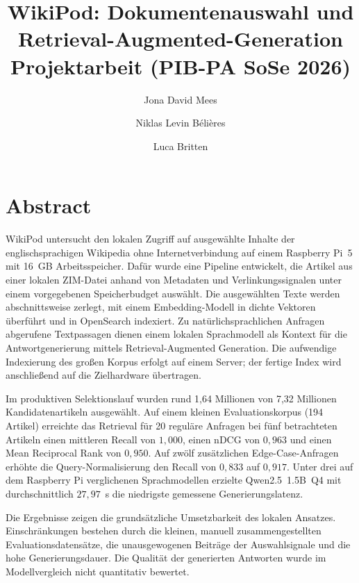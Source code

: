 \documentclass[a4paper,11pt,oneside,openany]{scrreprt}
\title{
    WikiPod: Dokumentenauswahl und Retrieval-Augmented-Generation\\
    \large Projektarbeit (PIB-PA SoSe 2026)
}
\author{
    Jona David Mees \and
    Niklas Levin Bélières \and
    Luca Britten
}
\date{}
\begin{document}
\maketitle

\chapter*{Abstract}
WikiPod untersucht den lokalen Zugriff auf ausgewählte Inhalte der
englischsprachigen Wikipedia ohne Internetverbindung auf einem Raspberry Pi~5
mit 16~GB Arbeitsspeicher. Dafür wurde eine Pipeline entwickelt, die Artikel
aus einer lokalen ZIM-Datei anhand von Metadaten und Verlinkungssignalen unter
einem vorgegebenen Speicherbudget auswählt. Die ausgewählten Texte werden
abschnittsweise zerlegt, mit einem Embedding-Modell in dichte Vektoren
überführt und in OpenSearch indexiert. Zu natürlichsprachlichen Anfragen
abgerufene Textpassagen dienen einem lokalen Sprachmodell als Kontext für
die Antwortgenerierung mittels Retrieval-Augmented Generation. Die aufwendige
Indexierung des großen Korpus erfolgt auf einem Server; der fertige Index
wird anschließend auf die Zielhardware übertragen.

Im produktiven Selektionslauf wurden rund 1,64 Millionen von 7,32 Millionen
Kandidatenartikeln ausgewählt. Auf einem kleinen Evaluationskorpus
(194 Artikel) erreichte das Retrieval für 20 reguläre Anfragen bei fünf
betrachteten Artikeln einen mittleren Recall von $1{,}000$, einen nDCG von $0{,}963$ und
einen Mean Reciprocal Rank von $0{,}950$. Auf zwölf zusätzlichen
Edge-Case-Anfragen erhöhte die Query-Normalisierung den Recall von
$0{,}833$ auf $0{,}917$. Unter drei auf dem Raspberry Pi verglichenen
Sprachmodellen erzielte Qwen2.5~1.5B~Q4 mit durchschnittlich $27{,}97$~s
die niedrigste gemessene Generierungslatenz.

Die Ergebnisse zeigen die grundsätzliche Umsetzbarkeit des lokalen Ansatzes.
Einschränkungen bestehen durch die kleinen, manuell zusammengestellten
Evaluationsdatensätze, die unausgewogenen Beiträge der Auswahlsignale und
die hohe Generierungsdauer. Die Qualität der generierten Antworten wurde
im Modellvergleich nicht quantitativ bewertet.


\tableofcontents
\clearpage
\begingroup
\let\clearpage\relax
\listoffigures
\listoftables
\endgroup

\clearpage
{}









\begingroup
{}

\par
\endgroup

\clearpage
\begingroup
\small
\singlespacing
\raggedright
\printbibliography
\endgroup

\clearpage
\appendix
\small
\singlespacing

\end{document}
